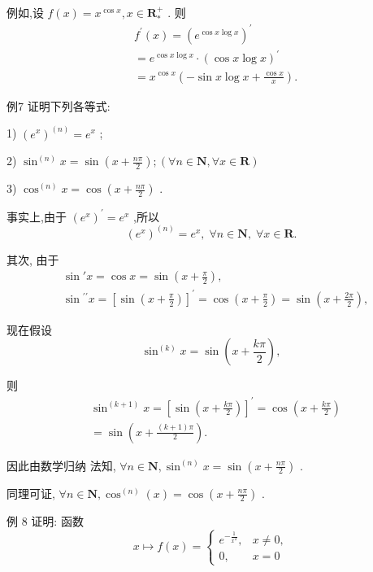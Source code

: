 例如,设 $f\left( x\right)  = {x}^{\cos x},x \in  {\mathbf{R}}_{ * }^{ + }$ . 则
\begin{align*}
	&{f}^{\prime }\left( x\right)  = {\left( {e}^{\cos x\log x}\right) }^{\prime }\\
	&= {e}^{\cos x\log x} \cdot  {\left( \cos x\log x\right) }^{\prime }\\
	&= {x}^{\cos x}\left( {-\sin x\log x + \frac{\cos x}{x}}\right) .
\end{align*}

例7 证明下列各等式:

1) ${\left( {e}^{x}\right) }^{\left( n\right) } = {e}^{x}$ ;

2) ${\sin }^{\left( n\right) }x = \sin \left( {x + \frac{n\pi }{2}}\right) ;\left( {\forall n \in  \mathbf{N},\forall x \in  \mathbf{R}}\right)$

3) ${\cos }^{\left( n\right) }x = \cos \left( {x + \frac{n\pi }{2}}\right)$ .

事实上,由于 ${\left( {e}^{x}\right) }^{\prime } = {e}^{x}$ ,所以
$${\left( {e}^{x}\right) }^{\left( n\right) } = {e}^{x},\;\forall n \in  \mathbf{N},\;\forall x \in  \mathbf{R}.$$

其次, 由于
\begin{align*}
	&\sin \prime x = \cos x = \sin \left( {x + \frac{\pi }{2}}\right) ,\\
	&\sin {}^{\prime \prime }x = {\left\lbrack  \sin \left( x + \frac{\pi }{2}\right) \right\rbrack  }^{\prime } = \cos \left( {x + \frac{\pi }{2}}\right)  = \sin \left( {x + \frac{2\pi }{2}}\right) ,
\end{align*}

现在假设
$${\sin }^{\left( k\right) }x = \sin \left( {x + \frac{k\pi }{2}}\right) ,$$

则
\begin{align*}
	&{\sin }^{\left( k + 1\right) }x = {\left\lbrack  \sin \left( x + \frac{k\pi }{2}\right) \right\rbrack  }^{\prime } = \cos \left( {x + \frac{k\pi }{2}}\right)\\
	&= \sin \left( {x + \frac{\left( {k + 1}\right) \pi }{2}}\right) .
\end{align*}

因此由数学归纳 法知, $\forall n \in  \mathbf{N},{\sin }^{\left( n\right) }x = \sin \left( {x + \frac{n\pi }{2}}\right)$ .

同理可证, $\forall n \in  \mathbf{N},{\cos }^{\left( n\right) }\left( x\right)  = \cos \left( {x + \frac{n\pi }{2}}\right)$ .

例 8 证明: 函数
$$x \mapsto  f\left( x\right)  = \left\{  \begin{array}{ll} {e}^{-\frac{1}{{x}^{2}}}, & x \neq  0, \\  0, & x = 0 \end{array}\right.$$

